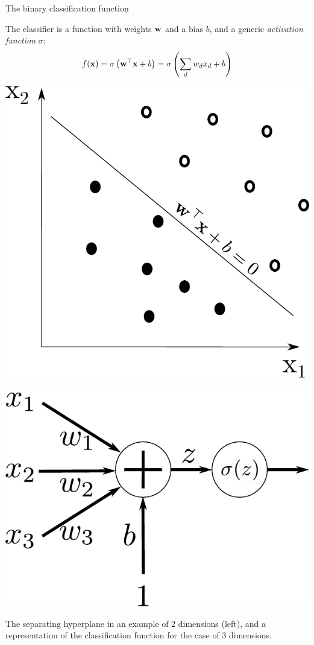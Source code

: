 \documentclass{beamer}
\begin{document}
\begin{frame}{The binary classification function}̣

The classifier is a function with weights $\bf w$  and a bias $b$, and a generic \emph{activation function} $\sigma$:
$$
f({\bf x}) =\sigma \left( {\bf w}^\top {\bf x} + b\right) =\sigma\left( \sum_d w_d x_d + b \right)
$$

    \begin{center}
        \includegraphics[scale=0.3]{Module 1 (NN)/pics/LinearClassifier].pdf}~~~~~~~~
        \includegraphics[scale=0.4]{Module 1 (NN)/pics/ArtificialPerceptron.pdf}
    \end{center}
\tiny{The separating hyperplane in an example of 2 dimensions (left), and a representation of the classification function for the case of 3 dimensions.}
\end{frame}
\end{document}
